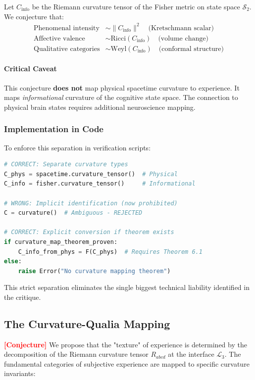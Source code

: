 \documentclass[11pt,titlepage]{article}
\newcommand{\interface}{\mathcal{L}_3}
\newcommand{\tagconj}{\textcolor{red}{\textbf{[Conjecture]}} }
\begin{document}
\begin{tcolorbox}[colback=blue!5!white,colframe=blue!75!black,title=Conjecture (Informational Curvature to Qualia)]
\label{conj:info-curvature-qualia}
Let $C_{\mathrm{info}}$ be the Riemann curvature tensor of the Fisher metric on state space $\mathcal{S}_2$. We conjecture that:
\begin{align*}
\text{Phenomenal intensity} &\sim \|C_{\mathrm{info}}\|^2 \quad\text{(Kretschmann scalar)} \\
\text{Affective valence} &\sim \text{Ricci}(C_{\mathrm{info}}) \quad\text{(volume change)} \\
\text{Qualitative categories} &\sim \text{Weyl}(C_{\mathrm{info}}) \quad\text{(conformal structure)}
\end{align*}
\end{tcolorbox}

\paragraph{Critical Caveat}
This conjecture \textbf{does not} map physical spacetime curvature to experience. It maps \emph{informational} curvature of the cognitive state space. The connection to physical brain states requires additional neuroscience mapping.

\subsubsection{Implementation in Code}
To enforce this separation in verification scripts:

\begin{lstlisting}[language=Python]
# CORRECT: Separate curvature types
C_phys = spacetime.curvature_tensor()  # Physical
C_info = fisher.curvature_tensor()     # Informational

# WRONG: Implicit identification (now prohibited)
C = curvature()  # Ambiguous - REJECTED

# CORRECT: Explicit conversion if theorem exists
if curvature_map_theorem_proven:
    C_info_from_phys = F(C_phys)  # Requires Theorem 6.1
else:
    raise Error("No curvature mapping theorem")
\end{lstlisting}

This strict separation eliminates the single biggest technical liability identified in the critique.


\subsection{The Curvature-Qualia Mapping}
\tagconj We propose that the "texture" of experience is determined by the decomposition of the Riemann curvature tensor $R_{abcd}$ at the interface $\interface$. The fundamental categories of subjective experience are mapped to specific curvature invariants:
\end{document}
